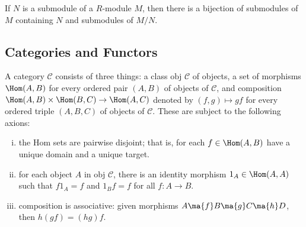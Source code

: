 \begin{thm}
If $N$ is a submodule of a $R$-module $M$, then there is a bijection of submodules of $M$ containing $N$ and submodules of $M/N$. 
\end{thm}



\subsection{Categories and Functors}

\begin{dfn}[Category]
A category $\mathcal{C}$ consists of three things: a class $\text{obj }\mathcal{C}$ of objects, a set of morphisms $\Hom(A,B)$ for every ordered pair $(A,B)$ of objects of $\mathcal{C}$, and composition $\Hom(A,B) \times \Hom(B,C) \to \Hom(A,C)$ denoted by $(f,g) \mapsto gf$ for every ordered triple $(A,B,C)$ of objects of $\mathcal{C}$. These are subject to the following axions:
	\begin{enumerate}[(i)]
	\item the Hom sets are pairwise disjoint; that is, for each $f \in \Hom(A,B)$ have a unique domain and a unique target. 
	\item for each object $A$ in $\text{obj }\mathcal{C}$, there is an identity morphism $1_A \in \Hom(A,A)$ such that $f1_A=f$ and $1_Bf=f$ for all $f: A \to B$.
	\item composition is associative: given morphisms $A \ma{f} B \ma{g} C \ma{h} D$, then $h(gf)=(hg)f$.
	\end{enumerate}
\end{dfn}


